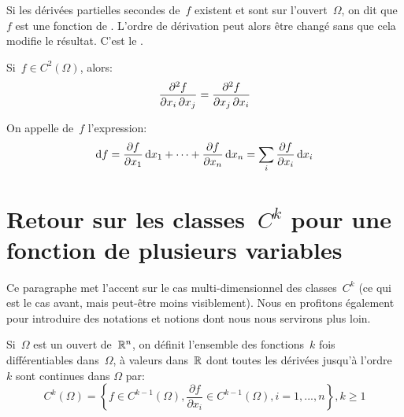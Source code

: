 Si  les dérivées partielles secondes de~$f$ existent et sont  sur l'ouvert~$\Omega$, on dit que~$f$ est une fonction de .
L'ordre de dérivation peut alors être changé sans que cela modifie le résultat.
C'est le .
\begin{theoreme}
Si~$f\in C^2(\Omega)$, alors:
\begin{equation}\colorred
  \frac{\partial^2f}{\partial x_i\, \partial x_j} = \frac{\partial^2f} {\partial x_j\, \partial x_i}
\end{equation}
\end{theoreme}

\begin{definition}
On appelle  de~$f$ l'expression:
\begin{equation}
  \text{d} f=\frac{\partial f}{\partial x_1}\,\text{d} x_1+\cdots+\frac{\partial f}{\partial x_n}\,\text{d} x_n
=  \displaystyle\sum_i \frac{\partial f}{\partial x_i}\,\text{d} x_i
\end{equation}
\end{definition}

\medskip
\section{Retour sur les classes~$C^k$ pour une fonction de plusieurs variables}

Ce paragraphe met l'accent sur le cas multi-dimensionnel des classes~$C^k$ (ce qui est le cas avant, mais peut-être moins visiblement). Nous en profitons également pour introduire des notations et notions dont nous nous servirons plus loin.

\medskip
\begin{definition}
Si~$\Omega$ est un ouvert de~$\mathbb R^n$, on définit l'ensemble des fonctions~$k$ fois différentiables dans~$\Omega$, à valeurs dans~$\mathbb R$ dont toutes les dérivées jusqu'à l'ordre~$k$ sont continues dans $\Omega$ par:
\begin{equation}
C^k(\Omega) = \left\{f\in C^{k-1}(\Omega), \dfrac{\partial f}{\partial x_i}\in C^{k-1}(\Omega),
i=1, ..., n\right\}, k\ge 1
\end{equation}
\end{definition}

